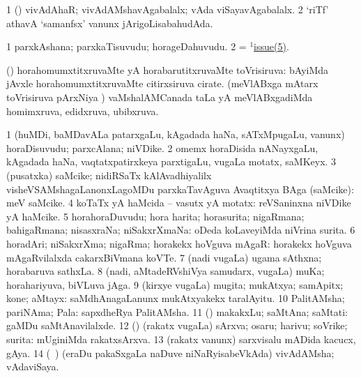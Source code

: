 \bentry
{}
\gl{\saMkiSx}
\bmng
{} 
\emng
\eentry

\bentry
{}
\gl{\gu}
\bmng
\bnum
\num{1} (\nAyxshA) vivAdAhaR; vivAdAMshavAgabalalx; vAda viSayavAgabalalx. 
\num{2} `riTf' athavA `samanfsx' \mo vanunx jArigoLisabahudAda. 
\enum
\emng
\eentry

\bentry
{}
\gl{\nA}
\bmng
\bnum
\num{1} parxkAshana; parxkaTisuvudu; horageDahuvudu. 
\num{2} =  \hyperlink{issue(1)5}{$^1$issue(5)}. 
\enum
\emng
\eentry

\bentry
{}
\gl{\gu}
\bmng
(\vaMlAM) 
\banum
{} horahomumxtitxruvaMte yA horabarutitxruvaMte toVrisiruva:  bAyiMda jAvxle horahomumxtitxruvaMte citirxsiruva cirate. 
 (meVlABxga mAtarx toVrisiruva pArxNiya \vi) vaMshalAMCanada taLa yA meVlABxgadiMda homimxruva, edidxruva, ubibxruva. 
\eanum
\emng
\eentry

\bentry
{}
\gl{\nA}
\bmng
\bnum
\num{1} (huMDi, baMDavALa patarxgaLu, kAgadada haNa, sATxMpugaLu, \mo vanunx) horaDisuvudu; parxcAlana; niVDike. 
\num{2} omemx horaDisida nANayxgaLu, kAgadada haNa, vaqtatxpatirxkeya parxtigaLu, \mo vugaLa motatx, saMKeyx. 
\num{3} (pusatxka) saMcike; nidiRSaTx kAlAvadhiyalilx visheVSAMshagaLanonxLagoMDu parxkaTavAguva Avaqtitxya BAga (saMcike):  meV saMcike. 
\num{4} koTaTx yA haMcida -- vasutx yA motatx:  reVSaninxna niVDike yA haMcike. 
\hypertarget{issue(1)5}{} 
\num{5} horahoraDuvudu; hora harita; horasurita; nigaRmana; bahigaRmana; nisasxraNa; niSakxrXmaNa:  oDeda koLaveyiMda niVrina surita. 
\num{6} horadAri; niSakxrXma; nigaRma; horakekx hoVguva mAgaR:  horakekx hoVguva mAgaRvilalxda cakarxBiVmana koVTe. 
\num{7} (nadi \mo vugaLa) ugama sAthxna; horabaruva sathxLa. 
\num{8} (nadi, aMtadeRVshiVya samudarx, \mo vugaLa) muKa; horahariyuva, biVLuva jAga. 
\num{9} (kirxye \mo vugaLa) mugita; mukAtxya; samApitx; kone; aMtayx:  saMdhAnagaLanunx mukAtxyakekx taralAyitu. 
\num{10} PalitAMsha; pariNAma; Pala:  sapxdheRya PalitAMsha. 
\num{11} (\nAyxshA) makakxLu; saMtAna; saMtati:  gaMDu saMtAnavilalxde. 
\num{12} (\pArxparx) (rakatx \mo vugaLa) sArxva; osaru; harivu; soVrike; surita:  mUginiMda rakatxsArxva. 
\num{13} (rakatx \mo vanunx) sarxvisalu mADida kacucx, gAya. 
\num{14} (\kanmu\ \nAyxshA) (eraDu pakaSxgaLa naDuve niNaRyisabeVkAda) vivAdAMsha; vAdaviSaya. 
\enum
\emng


